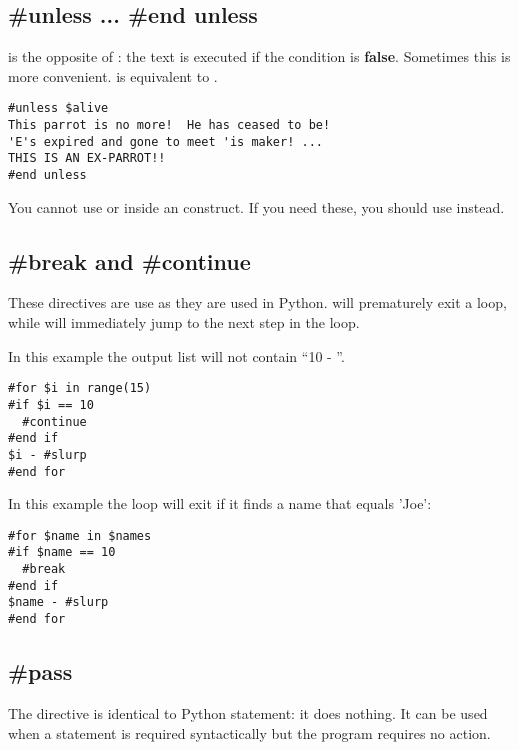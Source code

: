 \subsection{\#unless ... \#end unless}
\label{flowControl.unless}

 is the opposite of : the text is executed if the
condition is {\bf false}.  Sometimes this is more convenient.
 is equivalent to .

\begin{verbatim}
#unless $alive
This parrot is no more!  He has ceased to be!
'E's expired and gone to meet 'is maker! ...
THIS IS AN EX-PARROT!!
#end unless
\end{verbatim}

You cannot use  or  inside an 
construct.  If you need these, you should use  instead.

\subsection{\#break and \#continue}
\label{flowControl.break}

These directives are use as they are used in Python.  will
prematurely exit a  loop, while  will immediately
jump to the next step in the  loop.

In this example the output list will not contain ``10 - ''. 
\begin{verbatim}
#for $i in range(15)
#if $i == 10
  #continue
#end if
$i - #slurp
#end for
\end{verbatim}

In this example the loop will exit if it finds a name that equals 'Joe':
\begin{verbatim}
#for $name in $names
#if $name == 10
  #break
#end if
$name - #slurp
#end for
\end{verbatim}


\subsection{\#pass}
\label{flowControl.break}

The  directive is identical to Python  statement: it
does nothing. It can be used when a statement is required syntactically but the
program requires no action.

